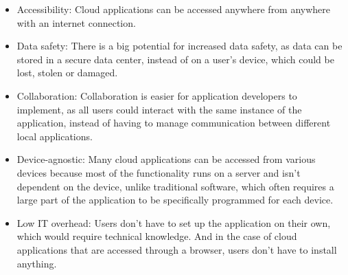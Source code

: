 \begin{itemize}
	\item Accessibility: Cloud applications can be accessed anywhere from anywhere with an internet connection.

	\item Data safety: There is a big potential for increased data safety, as data can be
	      stored in a secure data center, instead of on a user's device, which could be lost, stolen or damaged.

	\item Collaboration: Collaboration is easier for application developers to implement, as
	      all users could interact with the same instance of the application, instead
	      of having to manage communication between different local applications.

	\item Device-agnostic: Many cloud applications can be accessed from various devices because most
	      of the functionality runs on a server and isn't dependent on the device, unlike
	      traditional software, which often requires a large part of the application to be
	      specifically programmed for each device.

	\item Low IT overhead: Users don't have to set up the application on their own, which
	      would require technical knowledge. And in the case of cloud applications that are
	      accessed through a browser, users don't have to install anything.
\end{itemize}

